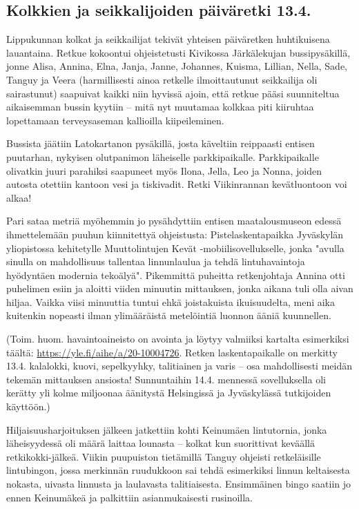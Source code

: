 \documentclass[10pt,finnish,a5paper,headings=small,twoside=semi]{scrartcl}
\begin{document}
\clearpage
\subsection{Kolkkien ja seikkalijoiden päiväretki 13.4.}

\begin{multicols}{2}

	Lippukunnan kolkat ja seikkailijat tekivät yhteisen päiväretken
	huhtikuisena lauantaina. Retkue kokoontui ohjeistetusti Kivikossa
	Järkälekujan bussipysäkillä, jonne Alisa, Annina, Elna, Janja, Janne,
	Johannes, Kuisma, Lillian, Nella, Sade, Tanguy ja Veera (harmillisesti
	ainoa retkelle ilmoittautunut seikkailija oli sairastunut) saapuivat
	kaikki niin hyvissä ajoin, että retkue pääsi suunniteltua aikaisemman
	bussin kyytiin – mitä nyt muutamaa kolkkaa piti kiiruhtaa lopettamaan
	terveysaseman kallioilla kiipeileminen.

	Bussista jäätiin Latokartanon pysäkillä, josta käveltiin reippaasti
	entisen puutarhan, nykyisen olutpanimon läheiselle parkkipaikalle.
	Parkkipaikalle olivatkin juuri parahiksi saapuneet myös Ilona, Jella,
	Leo ja Nonna, joiden autosta otettiin kantoon vesi ja tiskivadit. Retki
	Viikinrannan kevätluontoon voi alkaa!

	Pari sataa metriä myöhemmin jo pysähdyttiin entisen maatalousmuseon
	edessä ihmettelemään puuhun kiinnitettyä ohjeistusta:
	Pistelaskentapaikka Jyväskylän yliopistossa kehitetylle Muuttolintujen
	Kevät -mobiilisovellukselle, jonka "avulla sinulla on mahdollisuus
	tallentaa linnunlaulua ja tehdä lintuhavaintoja hyödyntäen modernia
	tekoälyä". Pikemmittä puheitta retkenjohtaja Annina otti puhelimen
	esiin ja aloitti viiden minuutin mittauksen, jonka aikana tuli olla
	aivan hiljaa. Vaikka viisi minuuttia tuntui ehkä joistakuista
	ikuisuudelta, meni aika kuitenkin nopeasti ilman ylimääräistä
	metelöintiä luonnon ääniä kuunnellen. 

	(Toim. huom. havaintoaineisto on avointa ja löytyy valmiiksi kartalta
	esimerkiksi täältä:
	\href{https://yle.fi/aihe/a/20-10004726}{https://yle.fi/aihe/a/20-10004726}.
	Retken laskentapaikalle on merkitty 13.4. kalalokki, kuovi,
	sepelkyyhky, talitiainen ja varis – osa mahdollisesti meidän tekemän
	mittauksen ansiosta! Sunnuntaihin 14.4. mennessä sovelluksella oli
	kerätty yli kolme miljoonaa äänitystä Helsingissä ja Jyväskylässä
	tutkijoiden käyttöön.)

	Hiljaisuusharjoituksen jälkeen jatkettiin kohti Keinumäen lintutornia,
	jonka läheisyydessä oli määrä laittaa lounasta – kolkat kun suorittivat
	keväällä retkikokki-jälkeä. Viikin puupuiston tietämillä Tanguy
	ohjeisti retkeläisille lintubingon, jossa merkinnän ruudukkoon sai
	tehdä esimerkiksi linnun keltaisesta nokasta, uivasta linnusta ja
	laulavasta talitiaisesta. Ensimmäinen bingo saatiin jo ennen Keinumäkeä
	ja palkittiin asianmukaisesti rusinoilla.


\end{multicols}
\end{document}
